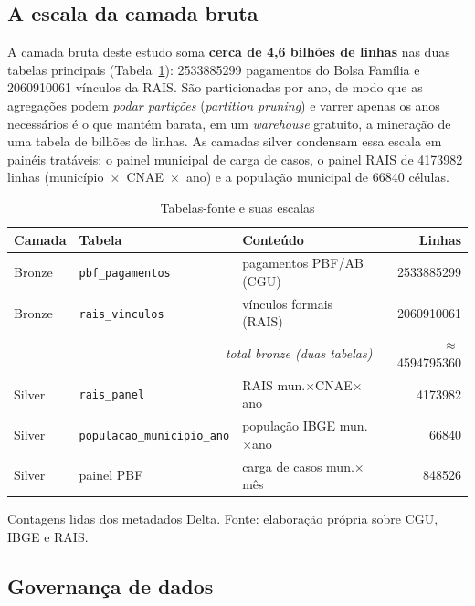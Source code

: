 \documentclass[12pt,a4paper,oneside]{article}
\begin{document}
\subsection{A escala da camada bruta}

A camada bruta deste estudo soma \textbf{cerca de 4,6 bilhões de linhas}
nas duas tabelas principais (Tabela~\ref{tab:bronze}): \num{2533885299}
pagamentos do Bolsa Família e \num{2060910061} vínculos da RAIS. São
particionadas por ano, de modo que as agregações podem \emph{podar
partições} (\emph{partition pruning}) e varrer apenas os anos necessários
\textemdash{} é o que mantém barata, em um \emph{warehouse} gratuito, a
mineração de uma tabela de bilhões de linhas. As camadas silver
condensam essa escala em painéis tratáveis: o painel municipal de carga de
casos, o painel RAIS de \num{4173982} linhas (município~$\times$~CNAE~$\times$~ano)
e a população municipal de \num{66840} células.

\begin{table}[H]
\centering
\caption{Tabelas-fonte e suas escalas}
\label{tab:bronze}
\small
\begin{tabular}{@{}lllr@{}}
\toprule
\textbf{Camada} & \textbf{Tabela} & \textbf{Conteúdo} & \textbf{Linhas} \\
\midrule
Bronze & \texttt{pbf\_pagamentos}  & pagamentos PBF/AB (CGU)        & \num{2533885299} \\
Bronze & \texttt{rais\_vinculos}   & vínculos formais (RAIS)         & \num{2060910061} \\
\midrule
\multicolumn{3}{r}{\textit{total bronze (duas tabelas)}} & $\approx$\,\num{4594795360} \\
\midrule
Silver & \texttt{rais\_panel}              & RAIS mun.$\times$CNAE$\times$ano & \num{4173982} \\
Silver & \texttt{populacao\_municipio\_ano}& população IBGE mun.$\times$ano    & \num{66840} \\
Silver & painel PBF                        & carga de casos mun.$\times$mês     & \num{848526} \\
\bottomrule
\end{tabular}
\par\smallskip
{\footnotesize Contagens lidas dos metadados Delta. Fonte: elaboração
própria sobre CGU, IBGE e RAIS.}
\end{table}

\subsection{Governança de dados}
\end{document}
